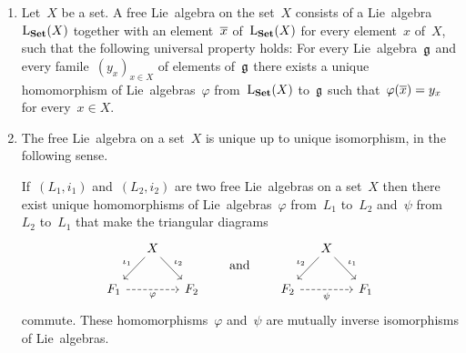 \begin{remark}
	\leavevmode
	\begin{enumerate}
		\item
			Let~$X$ be a set.
			A free Lie~algebra on the set~$X$ consists of a Lie~algebra~$\operatorname{L}_{\mathbf{Set}}(X)$ together with an element~$\overline{x}$ of~$\operatorname{L}_{\mathbf{Set}}(X)$ for every element~$x$ of~$X$, such that the following universal property holds:
			For every Lie~algebra~$\mathfrak{g}$ and every famile~$(y_x)_{x \in X}$ of elements of~$\mathfrak{g}$ there exists a unique homomorphism of Lie~algebras~$\varphi$ from~$\operatorname{L}_{\mathbf{Set}}(X)$ to~$\mathfrak{g}$ such that~$\varphi( \overline{x} ) = y_x$ for every~$x \in X$.
		\item
			The free Lie~algebra on a set~$X$ is unique up to unique isomorphism, in the following sense.

			If~$(L_1, i_1)$ and~$(L_2, i_2)$ are two free Lie~algebras on a set~$X$ then there exist unique homomorphisms of Lie~algebras~$\varphi$ from~$L_1$ to~$L_2$ and~$\psi$ from~$L_2$ to~$L_1$ that make the triangular diagrams
			\[
				\begin{tikzcd}[column sep = small]
					{}
					&
					X
					\arrow{dl}[above left]{\iota_1}
					\arrow{dr}[above right]{\iota_2}
					&
					{}
					\\
					F_1
					\arrow[dashed]{rr}[below]{\varphi}
					&
					{}
					&
					F_2
				\end{tikzcd}
				\qquad\text{and}\qquad
				\begin{tikzcd}[column sep = small]
					{}
					&
					X
					\arrow{dl}[above left]{\iota_2}
					\arrow{dr}[above right]{\iota_1}
					&
					{}
					\\
					F_2
					\arrow[dashed]{rr}[below]{\psi}
					&
					{}
					&
					F_1
				\end{tikzcd}
			\]
			commute.
			These homomorphisms~$\varphi$ and~$\psi$ are mutually inverse isomorphisms of Lie~algebras.


\end{enumerate}
\end{remark}
